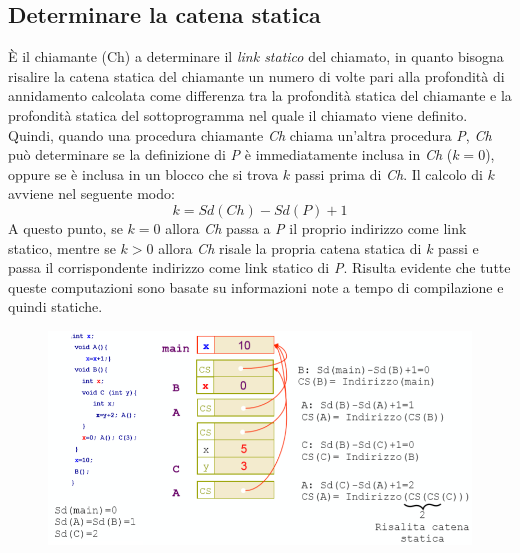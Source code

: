 \documentclass[a4paper,oneside,titlepage]{book}
\begin{document}
\subsection{Determinare la catena statica}
È il chiamante (Ch) a determinare il \textit{link statico} del chiamato, in quanto bisogna risalire la catena statica del chiamante un numero di volte pari alla profondità di annidamento calcolata come differenza tra la profondità statica del chiamante e la profondità statica del sottoprogramma nel quale il chiamato viene definito. Quindi, quando una procedura chiamante \textit{Ch} chiama un'altra procedura \textit{P}, \textit{Ch} può determinare se la definizione di \textit{P} è immediatamente inclusa in \textit{Ch} ($k=0$), oppure se è inclusa in un blocco che si trova $k$ passi prima di \textit{Ch}. Il calcolo di $k$ avviene nel seguente modo:
\[ k = Sd(Ch) - Sd(P) + 1 \]
A questo punto, se $k=0$ allora \textit{Ch} passa a \textit{P} il proprio indirizzo come link statico, mentre se $k>0$ allora \textit{Ch} risale la propria catena statica di $k$ passi e passa il corrispondente indirizzo come link statico di \textit{P}. Risulta evidente che tutte queste computazioni sono basate su informazioni note a tempo di compilazione e quindi statiche.
\begin{figure}[htp]
	\centering
	\includegraphics[width=\textwidth, height=\textheight, keepaspectratio]{catStat1.png}
\end{figure}
\end{document}
